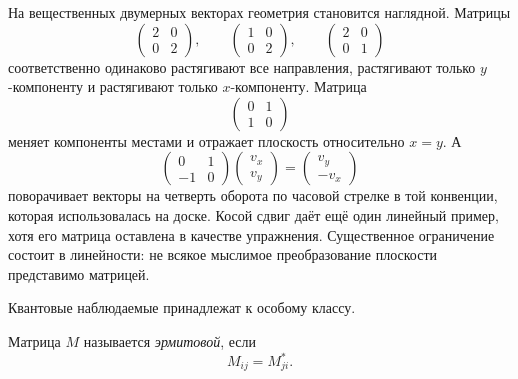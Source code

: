 На вещественных двумерных векторах геометрия становится наглядной. Матрицы
\begin{equation}
  \begin{pmatrix}2&0\\0&2\end{pmatrix},
  \qquad
  \begin{pmatrix}1&0\\0&2\end{pmatrix},
  \qquad
  \begin{pmatrix}2&0\\0&1\end{pmatrix}
\end{equation}
соответственно одинаково растягивают все направления, растягивают только \(y\)-компоненту и растягивают только \(x\)-компоненту. Матрица
\begin{equation}
  \begin{pmatrix}0&1\\1&0\end{pmatrix}
\end{equation}
меняет компоненты местами и отражает плоскость относительно \(x=y\). А
\begin{equation}
  \begin{pmatrix}0&1\\-1&0\end{pmatrix}
  \begin{pmatrix}v_x\\v_y\end{pmatrix}
  =
  \begin{pmatrix}v_y\\-v_x\end{pmatrix}
  \label{eq:l02-quarter-turn}
\end{equation}
поворачивает векторы на четверть оборота по часовой стрелке в той конвенции, которая использовалась на доске. Косой сдвиг даёт ещё один линейный пример, хотя его матрица оставлена в качестве упражнения. Существенное ограничение состоит в линейности: не всякое мыслимое преобразование плоскости представимо матрицей.

Квантовые наблюдаемые принадлежат к особому классу.

\begin{definition}
Матрица \(M\) называется \emph{эрмитовой}, если
\begin{equation}
  M_{ij}=M_{ji}^*.
  \label{eq:l02-hermitian-condition}
\end{equation}
\end{definition}

